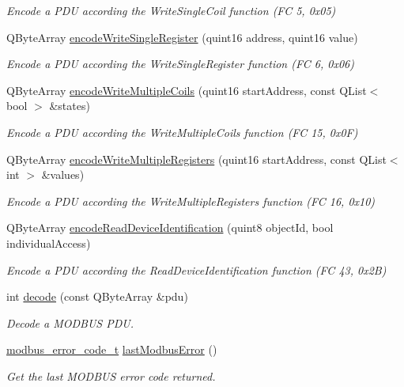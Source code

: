 \begin{DoxyCompactItemize}
\begin{DoxyCompactList}\small\item\em Encode a PDU according the WriteSingleCoil function (FC 5, 0x05) \end{DoxyCompactList}\item 
QByteArray \hyperlink{classmdt_frame_codec_modbus_a9499bf48476368d030c015114f886ae3}{encodeWriteSingleRegister} (quint16 address, quint16 value)
\begin{DoxyCompactList}\small\item\em Encode a PDU according the WriteSingleRegister function (FC 6, 0x06) \end{DoxyCompactList}\item 
QByteArray \hyperlink{classmdt_frame_codec_modbus_a12013e4433f96b2658b464698135e9fa}{encodeWriteMultipleCoils} (quint16 startAddress, const QList$<$ bool $>$ \&states)
\begin{DoxyCompactList}\small\item\em Encode a PDU according the WriteMultipleCoils function (FC 15, 0x0F) \end{DoxyCompactList}\item 
QByteArray \hyperlink{classmdt_frame_codec_modbus_a04092bf1d376c4c630b2311cbc5dd126}{encodeWriteMultipleRegisters} (quint16 startAddress, const QList$<$ int $>$ \&values)
\begin{DoxyCompactList}\small\item\em Encode a PDU according the WriteMultipleRegisters function (FC 16, 0x10) \end{DoxyCompactList}\item 
QByteArray \hyperlink{classmdt_frame_codec_modbus_a54ac76dc91ee6f885aa1536fb9f8531c}{encodeReadDeviceIdentification} (quint8 objectId, bool individualAccess)
\begin{DoxyCompactList}\small\item\em Encode a PDU according the ReadDeviceIdentification function (FC 43, 0x2B) \end{DoxyCompactList}\item 
int \hyperlink{classmdt_frame_codec_modbus_a426f465363a49d70890a462b40677787}{decode} (const QByteArray \&pdu)
\begin{DoxyCompactList}\small\item\em Decode a MODBUS PDU. \end{DoxyCompactList}\item 
\hyperlink{classmdt_frame_codec_modbus_a31d8291be7f8636d5d295ce3066d7ac7}{modbus\_\-error\_\-code\_\-t} \hyperlink{classmdt_frame_codec_modbus_a21f3102e12f1a1d9c4145c1ce1f8e6b6}{lastModbusError} ()
\begin{DoxyCompactList}\small\item\em Get the last MODBUS error code returned. \end{DoxyCompactList}\end{DoxyCompactItemize}


